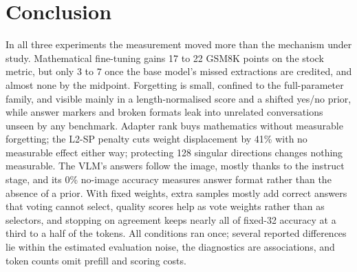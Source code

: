 \section{Conclusion}
\label{sec:conclusion}

In all three experiments the measurement moved more than the mechanism under study. Mathematical fine-tuning gains 17 to 22 GSM8K points on the stock metric, but only 3 to 7 once the base model's missed extractions are credited, and almost none by the midpoint. Forgetting is small, confined to the full-parameter family, and visible mainly in a length-normalised score and a shifted yes/no prior, while answer markers and broken formats leak into unrelated conversations unseen by any benchmark. Adapter rank buys mathematics without measurable forgetting; the L2-SP penalty cuts weight displacement by 41\% with no measurable effect either way; protecting 128 singular directions changes nothing measurable. The VLM's answers follow the image, mostly thanks to the instruct stage, and its 0\% no-image accuracy measures answer format rather than the absence of a prior. With fixed weights, extra samples mostly add correct answers that voting cannot select, quality scores help as vote weights rather than as selectors, and stopping on agreement keeps nearly all of fixed-32 accuracy at a third to a half of the tokens. All conditions ran once; several reported differences lie within the estimated evaluation noise, the diagnostics are associations, and token counts omit prefill and scoring costs.
